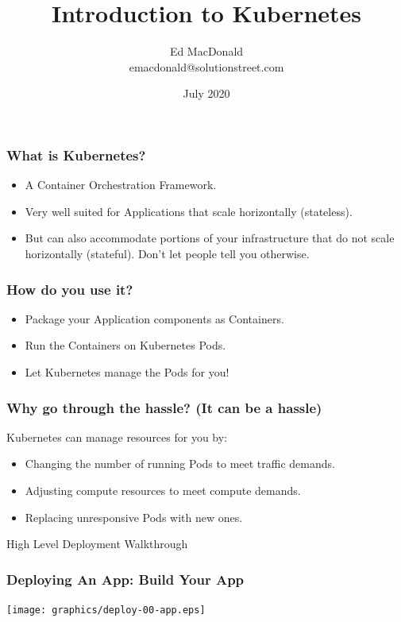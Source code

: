 \documentclass{beamer}
\title[Kubernetes]{Introduction to Kubernetes}
\author[Ed MacDonald]{Ed MacDonald\\emacdonald@solutionstreet.com}
\institute[\href{https://solutionstreet.com}{SolutionStreet}]{SolutionStreet\\\href{https://solutionstreet.com}{(solutionstreet.com)}}
\date{July 2020}
\begin{document}
\frame{\titlepage}

\begin{frame}
\frametitle{What is Kubernetes?}
\begin{itemize}
    \item{A Container Orchestration Framework.}\pause
    \item{Very well suited for Applications that scale horizontally (stateless).}\pause
    \item{But can also accommodate portions of your infrastructure that do not scale horizontally (stateful). Don't let people tell you otherwise.}
\end{itemize}
\end{frame}

\begin{frame}
    \frametitle{How do you use it?}
    \begin{itemize}
        \item{Package your Application components as Containers.}\pause
        \item{Run the Containers on Kubernetes Pods.}\pause
        \item{Let Kubernetes manage the Pods for you!}
    \end{itemize}
\end{frame}

\begin{frame}
    \frametitle{Why go through the hassle? (It can be a hassle)}
    Kubernetes can manage resources for you by:\pause
    \begin{itemize}
        \item{Changing the number of running Pods to meet traffic demands.}\pause
        \item{Adjusting compute resources to meet compute demands.}\pause
        \item{Replacing unresponsive Pods with new ones.}
    \end{itemize}
\end{frame}

\begin{frame}
    \begin{center}
        \Huge High Level Deployment Walkthrough
    \end{center}
\end{frame}

\begin{frame}
    \frametitle{Deploying An App: Build Your App}
    \texttt{[image: graphics/deploy-00-app.eps]}
\end{frame}
\end{document}
